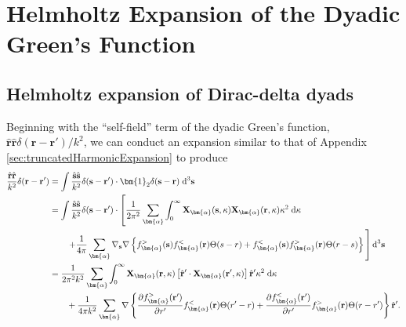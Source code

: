 
\section{Helmholtz Expansion of the Dyadic Green's Function}

\subsection{Helmholtz expansion of Dirac-delta dyads}\label{sec:diracDyadExpansion}

Beginning with the ``self-field'' term of the dyadic Green's function, $\hat{\mathbf{r}}\hat{\mathbf{r}}\delta(\mathbf{r} - \mathbf{r}')/k^2$, we can conduct an expansion similar to that of Appendix \ref{sec:truncatedHarmonicExpansion} to produce
\begin{equation}
\begin{split}
\frac{\hat{\mathbf{r}}\hat{\mathbf{r}}}{k^2}\delta(\mathbf{r} - \mathbf{r}') &= \int\frac{\hat{\mathbf{s}}\hat{\mathbf{s}}}{k^2}\delta(\mathbf{s} - \mathbf{r}')\cdot\bm{1}_2\delta(\mathbf{s} - \mathbf{r})\;\mathrm{d}^3\mathbf{s}\\
&= \int\frac{\hat{\mathbf{s}}\hat{\mathbf{s}}}{k^2}\delta(\mathbf{s} - \mathbf{r}')\cdot\left[\frac{1}{2\pi^2}\sum_{\bm{\alpha}}\int_0^\infty\mathbf{X}_{\bm{\alpha}}(\mathbf{s},\kappa)\mathbf{X}_{\bm{\alpha}}(\mathbf{r},\kappa)\kappa^2\;\mathrm{d}\kappa\right.\\
&\qquad\left.+\frac{1}{4\pi}\sum_{\bm{\alpha}}\nabla_{\mathbf{s}}\nabla\left\{f_{\bm{\alpha}}^>(\mathbf{s})f_{\bm{\alpha}}^<(\mathbf{r})\Theta(s - r) + f_{\bm{\alpha}}^<(\mathbf{s})f_{\bm{\alpha}}^>(\mathbf{r})\Theta(r - s)\right\} \vphantom{\int_0^\infty} \right]\mathrm{d}^3\mathbf{s}\\
&= \frac{1}{2\pi^2k^2}\sum_{\bm{\alpha}}\int_0^\infty\mathbf{X}_{\bm{\alpha}}(\mathbf{r},\kappa)\left[\hat{\mathbf{r}}'\cdot\mathbf{X}_{\bm{\alpha}}(\mathbf{r}',\kappa)\right]\hat{\mathbf{r}}'\kappa^2\;\mathrm{d}\kappa\\
&\qquad+\frac{1}{4\pi k^2}\sum_{\bm{\alpha}}\nabla\left\{\frac{\partial f_{\bm{\alpha}}^>(\mathbf{r}')}{\partial r'}f_{\bm{\alpha}}^<(\mathbf{r})\Theta(r' - r) + \frac{\partial f_{\bm{\alpha}}^<(\mathbf{r}')}{\partial r'}f_{\bm{\alpha}}^>(\mathbf{r})\Theta(r - r')\right\}\hat{\mathbf{r}}'.
\end{split}
\end{equation}







